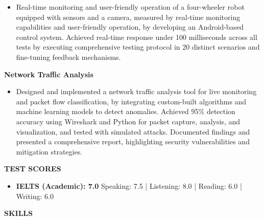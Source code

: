 \documentclass[a4paper, 12pt]{article}
\begin{document}
\begin{itemize}[noitemsep, topsep=0pt, partopsep=0pt, parsep=0pt]
	\item Real-time monitoring and user-friendly operation of a four-wheeler robot equipped with sensors and a camera, measured by real-time monitoring capabilities and user-friendly operation, by developing an Android-based control system. Achieved real-time response under 100 milliseconds across all tests by executing comprehensive testing protocol in 20 distinct scenarios and fine-tuning feedback mechanisms.
\end{itemize}
\vspace{12pt}

\textbf{Network Traffic Analysis}
\begin{itemize}[noitemsep, topsep=0pt, partopsep=0pt, parsep=0pt]
	\item Designed and implemented a network traffic analysis tool for live monitoring and packet flow classification, by integrating custom-built algorithms and machine learning models to detect anomalies. Achieved 95\% detection accuracy using Wireshark and Python for packet capture, analysis, and visualization, and tested with simulated attacks. Documented findings and presented a comprehensive report, highlighting security vulnerabilities and mitigation strategies.
\end{itemize}




\begin{flushleft}
	\noindent
	\textbf{TEST SCORES}\hrulefill
\end{flushleft}
\vspace{-12pt}

\begin{itemize}[noitemsep, topsep=0pt, partopsep=0pt, parsep=0pt]
	\item \textbf{IELTS (Academic): 7.0} Speaking: 7.5 | Listening: 8.0 | Reading: 6.0 | Writing: 6.0
\end{itemize}


\begin{flushleft}
	\noindent
	\textbf{SKILLS}\hrulefill
\end{flushleft}
\vspace{-12pt}
\end{document}
